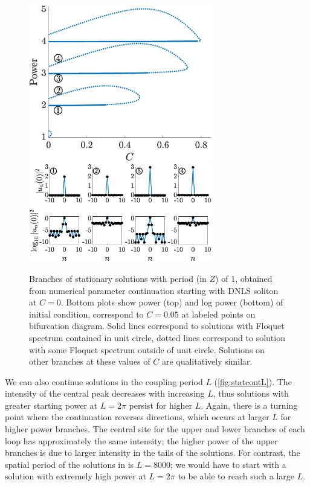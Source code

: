 \documentclass[reprint, amsmath,amssymb,aps,pre]{revtex4-2}
\begin{document}
\begin{figure}
    \centering
    \includegraphics[width=8cm]{stat1234AC.eps}
    \includegraphics[width=8cm]{stat1234ACsols.eps}
    \caption{Branches of stationary solutions with period (in $Z$) of 1, obtained from numerical parameter continuation starting with DNLS soliton at $C=0$. Bottom plots show power (top) and log power (bottom) of initial condition, correspond to $C=0.05$ at labeled points on bifurcation diagram. Solid lines correspond to solutions with Floquet spectrum contained in unit circle, dotted lines correspond to solution with some Floquet spectrum outside of unit circle. Solutions on other branches at these values of $C$ are qualitatively similar.} %
    \label{fig:statAC}
\end{figure}

We can also continue solutions in the coupling period $L$ (\cref{fig:statcontL}). The intensity of the central peak decreases with increasing $L$, thus solutions with greater starting power at $L=2\pi$ persist for higher $L$. Again, there is a turning point where the continuation reverses directions, which occurs at larger $L$ for higher power branches. The central site for the upper and lower branches of each loop has approximately the same intensity; the higher power of the upper branches is due to larger intensity in the tails of the solutions. For contrast, the spatial period of the solutions in \cite[Figure 2]{Jurgensen2021} is $L=8000$; we would have to start with a solution with extremely high power at $L=2\pi$ to be able to reach such a large $L$.
\end{document}
